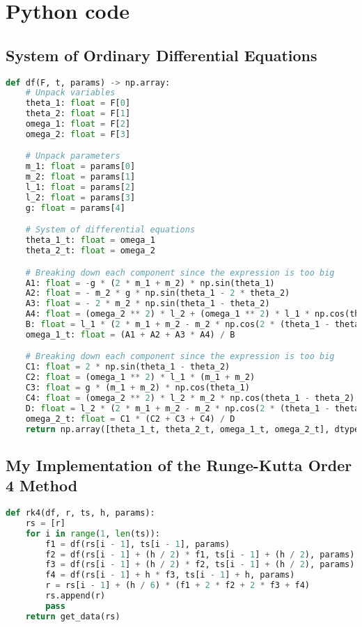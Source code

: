 \section{Python code}\label{sec:python-code}
\lstset{style=mystyle}

\subsection{System of Ordinary Differential Equations}\label{subsec:system-of-ordinary-differential-equations}
\begin{lstlisting}[language=Python]
def df(F, t, params) -> np.array:
    # Unpack variables
    theta_1: float = F[0]
    theta_2: float = F[1]
    omega_1: float = F[2]
    omega_2: float = F[3]

    # Unpack parameters
    m_1: float = params[0]
    m_2: float = params[1]
    l_1: float = params[2]
    l_2: float = params[3]
    g: float = params[4]

    # System of differential equations
    theta_1_t: float = omega_1
    theta_2_t: float = omega_2

    # Breaking down each component since the expression is too big
    A1: float = -g * (2 * m_1 + m_2) * np.sin(theta_1)
    A2: float = - m_2 * g * np.sin(theta_1 - 2 * theta_2)
    A3: float = - 2 * m_2 * np.sin(theta_1 - theta_2)
    A4: float = (omega_2 ** 2) * l_2 + (omega_1 ** 2) * l_1 * np.cos(theta_1 - theta_2)
    B: float = l_1 * (2 * m_1 + m_2 - m_2 * np.cos(2 * (theta_1 - theta_2)))
    omega_1_t: float = (A1 + A2 + A3 * A4) / B

    # Breaking down each component since the expression is too big
    C1: float = 2 * np.sin(theta_1 - theta_2)
    C2: float = (omega_1 ** 2) * l_1 * (m_1 + m_2)
    C3: float = g * (m_1 + m_2) * np.cos(theta_1)
    C4: float = (omega_2 ** 2) * l_2 * m_2 * np.cos(theta_1 - theta_2)
    D: float = l_2 * (2 * m_1 + m_2 - m_2 * np.cos(2 * (theta_1 - theta_2)))
    omega_2_t: float = C1 * (C2 + C3 + C4) / D
    return np.array([theta_1_t, theta_2_t, omega_1_t, omega_2_t], dtype=float)
\end{lstlisting}

\subsection{My Implementation of the Runge-Kutta Order 4 Method}
\label{subsec:my-implementation-of-the-runge-kutta-order-4-method}
\begin{lstlisting}[language=Python]
def rk4(df, r, ts, h, params):
    rs = [r]
    for i in range(1, len(ts)):
        f1 = df(rs[i - 1], ts[i - 1], params)
        f2 = df(rs[i - 1] + (h / 2) * f1, ts[i - 1] + (h / 2), params)
        f3 = df(rs[i - 1] + (h / 2) * f2, ts[i - 1] + (h / 2), params)
        f4 = df(rs[i - 1] + h * f3, ts[i - 1] + h, params)
        r = rs[i - 1] + (h / 6) * (f1 + 2 * f2 + 2 * f3 + f4)
        rs.append(r)
        pass
    return get_data(rs)
\end{lstlisting}


